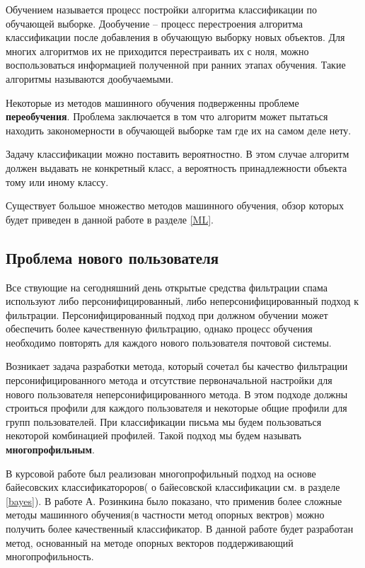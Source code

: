 Обучением называется процесс постройки алгоритма классификации по обучающей выборке. Дообучение – процесс перестроения алгоритма классификации после добавления в обучающую выборку новых объектов. Для многих алгоритмов их не приходится перестраивать их с ноля, можно воспользоваться информацией полученной при ранних этапах обучения. Такие алгоритмы называются дообучаемыми.

Некоторые из методов машинного обучения подверженны проблеме \textbf{переобучения}. Проблема заключается в том что алгоритм может пытаться находить закономерности в обучающей выборке там где их на самом деле нету.

Задачу классификации можно поставить вероятностно. В этом случае алгоритм должен выдавать не конкретный класс, а вероятность принадлежности объекта тому или иному классу.

Существует большое множество методов машинного обучения, обзор которых будет приведен в данной работе в разделе \ref{ML}.

\subsection{Проблема нового пользователя}

Все ствующие на сегодняшний день открытые средства фильтрации спама используют либо персонифицированный, либо неперсонифицированный подход к фильтрации. Персонифицированный подход при должном обучении может обеспечить более качественную фильтрацию, однако процесс обучения необходимо повторять для каждого нового пользователя почтовой системы. 

Возникает задача разработки метода, который сочетал бы качество фильтрации персонифицированного метода и отсутствие первоначальной настройки для нового пользователя неперсонифицированного метода. В этом подходе должны строиться профили для каждого пользователя  и некоторые общие профили для групп пользователей. При классификации письма мы будем пользоваться некоторой комбинацией профилей. Такой подход мы будем называть \textbf{многопрофильным}.

В курсовой работе \cite{PETROV10} был реализован многопрофильный подход на основе байесовских классификатороров( о байесовской классификации см. в разделе \ref{bayes}). В работе А. Розинкина\cite{ROZ} было показано, что применив более сложные методы машинного обучения(в частности метод опорных вектров) можно получить более качественный классификатор. В данной работе будет разработан метод, основанный на методе опорных векторов поддерживающий многопрофильность.
